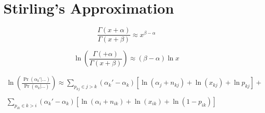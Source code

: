 \documentclass{article}
\begin{document}
\section{Stirling's Approximation}

\[
\frac{\Gamma(x + \alpha)}{\Gamma(x + \beta)} \approx  x^{\beta - \alpha}
\]

\[
\ln\left(\frac{\Gamma( + \alpha)}{\Gamma(x + \beta)}\right) \approx  (\beta - \alpha)\ln x
\]


\begin{multline}
\ln\left(\frac{\Pr(\alpha_k'|...)}{\Pr(\alpha_k|...)}\right) \approx \sum_{p_{kj} \in
    j > k} (\alpha_k' - \alpha_k)\left[\ln (\alpha_j + n_{kj}) + \ln(x_{kj}) + \ln p_{kj}\right] +\\
\\
 \sum_{p_{ik} \in
    k > i}  (\alpha_k' - \alpha_k)\left[\ln (\alpha_i + n_{ik}) + \ln(x_{ik}) + \ln (1 - p_{ik})\right]\\
\end{multline}
\end{document}
